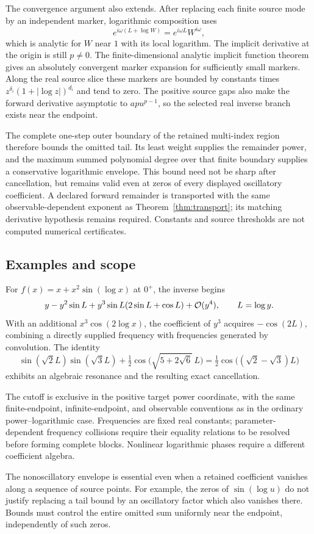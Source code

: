 The convergence argument also extends. After replacing each finite source
mode by an independent marker, logarithmic composition uses
\[
 e^{i\omega(L+\log W)}=e^{i\omega L}W^{i\omega},
\]
which is analytic for $W$ near $1$ with its local logarithm. The implicit
derivative at the origin is still $p\ne0$. The finite-dimensional analytic
implicit function theorem gives an absolutely convergent marker expansion
for sufficiently small markers. Along the real source slice these markers
are bounded by constants times $z^{\delta_i}(1+|\log z|)^{d_i}$ and tend to
zero. The positive source gaps also make the forward derivative asymptotic
to $ap u^{p-1}$, so the selected real inverse branch exists near the endpoint.

The complete one-step outer boundary of the retained multi-index region
therefore bounds the omitted tail. Its least weight supplies the remainder
power, and the maximum summed polynomial degree over that finite boundary
supplies a conservative logarithmic envelope. This bound need not be sharp
after cancellation, but remains valid even at zeros of every displayed
oscillatory coefficient. A declared forward remainder is transported with
the same observable-dependent exponent as Theorem~\ref{thm:transport}; its
matching derivative hypothesis remains required. Constants and source
thresholds are not computed numerical certificates.

\subsection{Examples and scope}

For $f(x)=x+x^2\sin(\log x)$ at $0^+$, the inverse begins
\[
 y-y^2\sin L+y^3\sin L(2\sin L+\cos L)+\mathcal O(y^4),
 \qquad L=\log y.
\]
With an additional $x^3\cos(2\log x)$, the coefficient of $y^3$ acquires
$-\cos(2L)$, combining a directly supplied frequency with frequencies
generated by convolution. The identity
\[
 \sin(\sqrt2L)\sin(\sqrt3L)
 +\tfrac12\cos\!\bigl(\sqrt{5+2\sqrt6}\,L\bigr)
 =\tfrac12\cos\!\bigl((\sqrt2-\sqrt3)L\bigr)
\]
exhibits an algebraic resonance and the resulting exact cancellation.

The cutoff is exclusive in the positive target power coordinate, with the
same finite-endpoint, infinite-endpoint, and observable conventions as in
the ordinary power--logarithmic case. Frequencies are fixed real constants;
parameter-dependent frequency collisions require their equality relations
to be resolved before forming complete blocks. Nonlinear logarithmic phases
require a different coefficient algebra.

The nonoscillatory envelope is essential even when a retained coefficient
vanishes along a sequence of source points. For example, the zeros of
$\sin(\log u)$ do not justify replacing a tail bound by an oscillatory
factor which also vanishes there. Bounds must control the entire omitted
sum uniformly near the endpoint, independently of such zeros.

